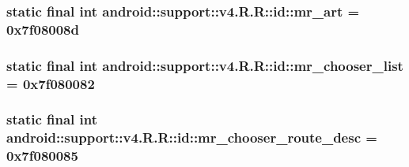\hypertarget{classandroid_1_1support_1_1v4_1_1_r_1_1id_d20ac5c3195d2c1c594478d8b8390a84}{
\subsubsection[{mr\_\-art}]{\setlength{\rightskip}{0pt plus 5cm}static final int android::support::v4.R.R::id::mr\_\-art = 0x7f08008d}}
\label{classandroid_1_1support_1_1v4_1_1_r_1_1id_d20ac5c3195d2c1c594478d8b8390a84}


\hypertarget{classandroid_1_1support_1_1v4_1_1_r_1_1id_6142159a3dcfd9761c68d0beed6dbbde}{
\subsubsection[{mr\_\-chooser\_\-list}]{\setlength{\rightskip}{0pt plus 5cm}static final int android::support::v4.R.R::id::mr\_\-chooser\_\-list = 0x7f080082}}
\label{classandroid_1_1support_1_1v4_1_1_r_1_1id_6142159a3dcfd9761c68d0beed6dbbde}


\hypertarget{classandroid_1_1support_1_1v4_1_1_r_1_1id_cfeb9c34b40d9b921602b566e3c23bd0}{
\subsubsection[{mr\_\-chooser\_\-route\_\-desc}]{\setlength{\rightskip}{0pt plus 5cm}static final int android::support::v4.R.R::id::mr\_\-chooser\_\-route\_\-desc = 0x7f080085}}
\label{classandroid_1_1support_1_1v4_1_1_r_1_1id_cfeb9c34b40d9b921602b566e3c23bd0}


